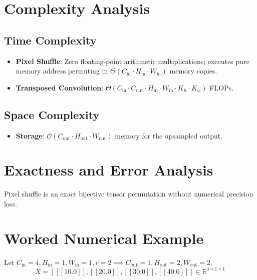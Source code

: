 \documentclass[11pt,a4paper]{article}
\theoremstyle{definition}
\begin{document}
\section{Complexity Analysis}

\subsection{Time Complexity}
\begin{itemize}
    \item \textbf{Pixel Shuffle}: Zero floating-point arithmetic multiplications; executes pure memory address permuting in $\Theta(C_{\text{in}} \cdot H_{\text{in}} \cdot W_{\text{in}})$ memory copies.
    \item \textbf{Transposed Convolution}: $\Theta(C_{\text{in}} \cdot C_{\text{out}} \cdot H_{\text{in}} \cdot W_{\text{in}} \cdot K_h \cdot K_w)$ FLOPs.
\end{itemize}

\subsection{Space Complexity}
\begin{itemize}
    \item \textbf{Storage}: $\mathcal{O}(C_{\text{out}} \cdot H_{\text{out}} \cdot W_{\text{out}})$ memory for the upsampled output.
\end{itemize}

\section{Exactness and Error Analysis}

Pixel shuffle is an exact bijective tensor permutation without numerical precision loss.

\section{Worked Numerical Example}

Let $C_{\text{in}} = 4, H_{\text{in}} = 1, W_{\text{in}} = 1, r = 2 \implies C_{\text{out}} = 1, H_{\text{out}} = 2, W_{\text{out}} = 2$.
\begin{equation}
X = [[[10.0]], [[20.0]], [[30.0]], [[40.0]]] \in \mathbb{R}^{4 \times 1 \times 1}
\end{equation}
\end{document}
